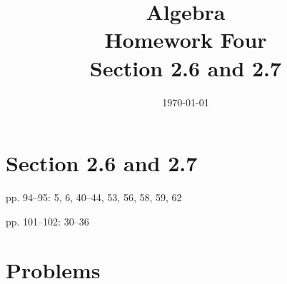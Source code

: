 \documentclass[letterpaper, landscape]{exam}
\title{Algebra \\ Homework Four \\ Section 2.6 and 2.7}
\author{}
\date{\today}
\begin{document}
  \maketitle

  \section{Section 2.6 and 2.7}
  \begin{itemize*}
    \item pp. 94--95: 5, 6, 40--44, 53, 56, 58, 59, 62
    \item pp. 101--102: 30--36
  \end{itemize*}

  \section{Problems}
\end{document}
